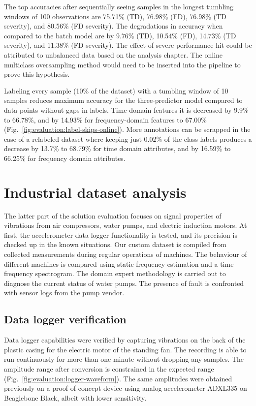 The top accuracies after sequentially seeing samples in the longest tumbling windows of 100 observations are 75.71\% (TD), 76.98\% (FD), 76.98\% (TD severity), and 80.56\% (FD severity). The degradations in accuracy when compared to the batch model are by 9.76\% (TD), 10.54\% (FD), 14.73\% (TD severity), and 11.38\% (FD severity). The effect of severe performance hit could be attributed to unbalanced data based on the analysis chapter. The online multiclass oversampling method would need to be inserted into the pipeline to prove this hypothesis.

Labeling every  sample (10\% of the dataset) with a tumbling window of 10 samples reduces maximum accuracy for the three-predictor model compared to data points without gaps in labels. Time-domain features it is decreased by 9.9\% to 66.78\%, and by 14.93\% for frequency-domain features to 67.00\% (Fig.~\ref{fig:evaluation:label-skips-online}). More annotations can be scrapped in the case of a relabeled dataset where keeping just 0.02\% of the class labels produces a decrease by 13.7\% to 68.79\% for time domain attributes, and by 16.59\% to 66.25\% for frequency domain attributes.


\section{Industrial dataset analysis}
The latter part of the solution evaluation focuses on signal properties of vibrations from air compressors, water pumps, and electric induction motors. At first, the accelerometer data logger functionality is tested, and its precision is checked up in the known situations. Our custom dataset is compiled from collected measurements during regular operations of machines. The behaviour of different machines is compared using static frequency estimation and a time-frequency spectrogram. The domain expert methodology is carried out to diagnose the current status of water pumps. The presence of fault is confronted with sensor logs from the pump vendor.

\subsection{Data logger verification}
Data logger capabilities were verified by capturing vibrations on the back of the plastic casing for the electric motor of the standing fan. The recording is able to run continuously for more than one minute without dropping any samples. The amplitude range after conversion is constrained in the expected range (Fig.~\ref{fig:evaluation:logger-waveform}). The same amplitudes were obtained previously on a proof-of-concept device using analog accelerometer ADXL335 on Beaglebone Black, albeit with lower sensitivity.

